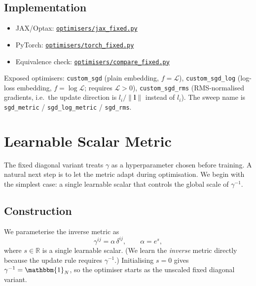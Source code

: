 \documentclass{article}
\newcommand{\loss}{\mathcal{L}}
\newcommand{\Id}{\mathbbm{1}}
\newcommand{\vecb}[1]{\boldsymbol{#1}}
\begin{document}
\subsection{Implementation}
\begin{itemize}
    \item JAX/Optax: \href{https://github.com/Noah-Everett/Induced-Metric-Optimiser/blob/main/optimisers/jax_fixed.py}{\texttt{optimisers/jax\_fixed.py}}
    \item PyTorch: \href{https://github.com/Noah-Everett/Induced-Metric-Optimiser/blob/main/optimisers/torch_fixed.py}{\texttt{optimisers/torch\_fixed.py}}
    \item Equivalence check: \href{https://github.com/Noah-Everett/Induced-Metric-Optimiser/blob/main/optimisers/compare_fixed.py}{\texttt{optimisers/compare\_fixed.py}}
\end{itemize}
\begin{sloppypar}
Exposed optimisers: \texttt{custom\_sgd} (plain embedding, $f=\loss$),
\texttt{custom\_sgd\_log} (log-loss embedding, $f=\log\loss$; requires $\loss>0$),
\texttt{custom\_sgd\_rms} (RMS-normalised gradients, i.e.\ the update direction is
$l_i/\|\vecb{l}\|$ instead of $l_i$).
The sweep name is \texttt{sgd\_metric} / \texttt{sgd\_log\_metric} / \texttt{sgd\_rms}.
\end{sloppypar}


\section{Learnable Scalar Metric}\label{sec:scalar}

The fixed diagonal variant treats $\gamma$ as a hyperparameter chosen before training.
A natural next step is to let the metric adapt during optimisation.
We begin with the simplest case: a single learnable scalar
that controls the global scale of $\gamma^{-1}$.

\subsection{Construction}
We parameterise the inverse metric as $$
    \gamma^{ij} = \alpha\,\delta^{ij}, \qquad \alpha = e^s,
$$ where $s\in\mathbb{R}$ is a single learnable scalar.
(We learn the \emph{inverse} metric directly because the update rule requires $\gamma^{-1}$.)
Initialising $s=0$ gives $\gamma^{-1}=\Id_N$, so the optimiser starts as the unscaled fixed diagonal variant.
\end{document}
